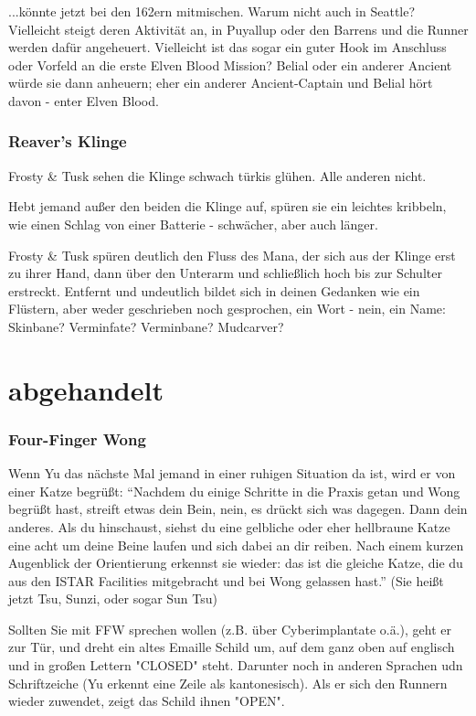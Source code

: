 ...könnte jetzt bei den 162ern mitmischen. Warum nicht auch in Seattle? Vielleicht steigt deren Aktivität an, in Puyallup oder den Barrens und die Runner werden dafür angeheuert. Vielleicht ist das sogar ein guter Hook im Anschluss oder Vorfeld an die erste Elven Blood Mission? Belial oder ein anderer Ancient würde sie dann anheuern; eher ein anderer Ancient-Captain und Belial hört davon - enter Elven Blood.


\subsubsection{Reaver's Klinge}
Frosty \& Tusk sehen die Klinge schwach türkis glühen. Alle anderen nicht.

Hebt jemand außer den beiden die Klinge auf, spüren sie ein leichtes kribbeln, wie einen Schlag von einer Batterie - schwächer, aber auch länger.

Frosty \& Tusk spüren deutlich den Fluss des Mana, der sich aus der Klinge erst zu ihrer Hand, dann über den Unterarm und schließlich hoch bis zur Schulter erstreckt. Entfernt und undeutlich bildet sich in deinen Gedanken wie ein Flüstern, aber weder geschrieben noch gesprochen, ein Wort - nein, ein Name: Skinbane? Verminfate? Verminbane? Mudcarver?







\section{abgehandelt}

\subsubsection{Four-Finger Wong}
Wenn Yu das nächste Mal jemand in einer ruhigen Situation da ist, wird er von einer Katze begrüßt: ``Nachdem du einige Schritte in die Praxis getan und Wong begrüßt hast, streift etwas dein Bein, nein, es drückt sich was dagegen. Dann dein anderes. Als du hinschaust, siehst du eine gelbliche oder eher hellbraune Katze eine acht um deine Beine laufen und sich dabei an dir reiben. Nach einem kurzen Augenblick der Orientierung erkennst sie wieder: das ist die gleiche Katze, die du aus den ISTAR Facilities mitgebracht und bei Wong gelassen hast.'' (Sie heißt jetzt Tsu, Sunzi, oder sogar Sun Tsu)

\vspace{0.5em}
Sollten Sie mit FFW sprechen wollen (z.B. über Cyberimplantate o.ä.), geht er zur Tür, und dreht ein altes Emaille Schild um, auf dem ganz oben auf englisch und in großen Lettern "CLOSED" steht. Darunter noch in anderen Sprachen udn Schriftzeiche (Yu erkennt eine Zeile als kantonesisch). Als er sich den Runnern wieder zuwendet, zeigt das Schild ihnen "OPEN".